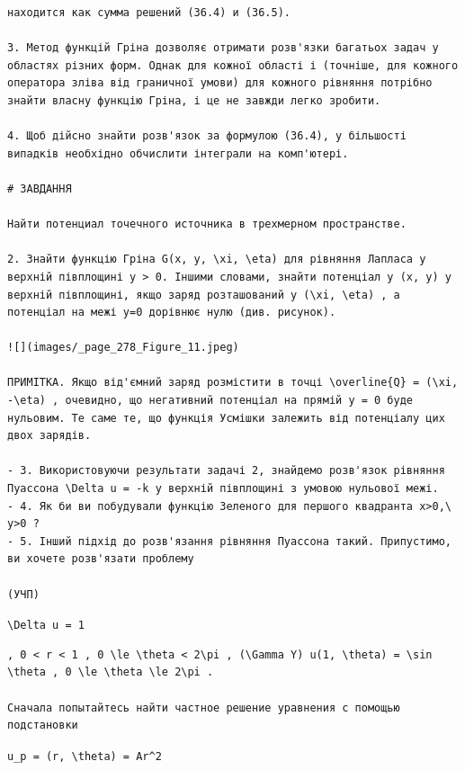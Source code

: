 \documentclass[
  ukrainian,
]{article}
\begin{document}
\begin{verbatim}
находится как сумма решений (36.4) и (36.5).

3. Метод функцій Гріна дозволяє отримати розв'язки багатьох задач у областях різних форм. Однак для кожної області і (точніше, для кожного оператора зліва від граничної умови) для кожного рівняння потрібно знайти власну функцію Гріна, і це не завжди легко зробити.

4. Щоб дійсно знайти розв'язок за формулою (36.4), у більшості випадків необхідно обчислити інтеграли на комп'ютері.

# ЗАВДАННЯ

Найти потенциал точечного источника в трехмерном пространстве.

2. Знайти функцію Гріна G(x, y, \xi, \eta) для рівняння Лапласа у верхній півплощині y > 0. Іншими словами, знайти потенціал у (x, y) у верхній півплощині, якщо заряд розташований у (\xi, \eta) , а потенціал на межі y=0 дорівнює нулю (див. рисунок).

![](images/_page_278_Figure_11.jpeg)

ПРИМІТКА. Якщо від'ємний заряд розмістити в точці \overline{Q} = (\xi, -\eta) , очевидно, що негативний потенціал на прямій y = 0 буде нульовим. Те саме те, що функція Усмішки залежить від потенціалу цих двох зарядів.

- 3. Використовуючи результати задачі 2, знайдемо розв'язок рівняння Пуассона \Delta u = -k у верхній півплощині з умовою нульової межі.
- 4. Як би ви побудували функцію Зеленого для першого квадранта x>0,\ y>0 ?
- 5. Інший підхід до розв'язання рівняння Пуассона такий. Припустимо, ви хочете розв'язати проблему

(УЧП)
\end{verbatim}

\texttt{\textbackslash{}Delta\ u\ =\ 1}

\begin{verbatim}
, 0 < r < 1 , 0 \le \theta < 2\pi , (\Gamma Y) u(1, \theta) = \sin \theta , 0 \le \theta \le 2\pi .

Сначала попытайтесь найти частное решение уравнения с помощью подстановки
\end{verbatim}

\texttt{u\_p\ =\ (r,\ \textbackslash{}theta)\ =\ Ar\^{}2}
\end{document}
